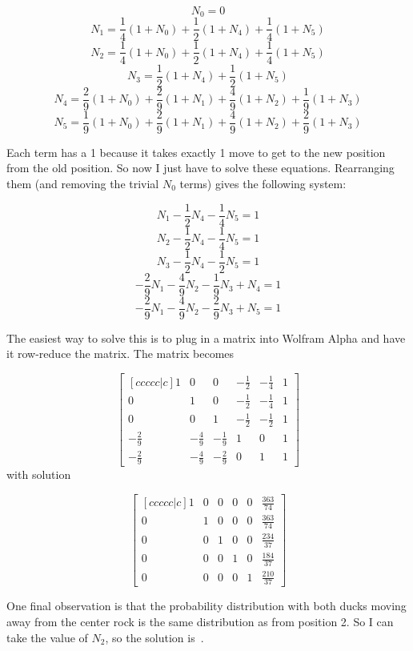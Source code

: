 \documentclass{article}
\begin{document}
\[
N_{0}=0
\]
\[
N_{1}=\frac{1}{4}(1+N_{0})+\frac{1}{2}(1+N_{4})+\frac{1}{4}(1+N_{5})
\]
\[
N_{2}=\frac{1}{4}(1+N_{0})+\frac{1}{2}(1+N_{4})+\frac{1}{4}(1+N_{5})
\]
\[
N_{3}=\frac{1}{2}(1+N_{4})+\frac{1}{2}(1+N_{5})
\]
\[
N_{4}=\frac{2}{9}(1+N_{0})+\frac{2}{9}(1+N_{1})+\frac{4}{9}(1+N_{2})+\frac{1}{9}(1+N_{3})
\]
\[
N_{5}=\frac{1}{9}(1+N_{0})+\frac{2}{9}(1+N_{1})+\frac{4}{9}(1+N_{2})+\frac{2}{9}(1+N_{3})
\]

Each term has a 1 because it takes exactly 1 move to get to the new position from the old position.
So now I just have to solve these equations.
Rearranging them (and removing the trivial $N_{0}$ terms) gives the following system:

\[
N_{1}-\frac{1}{2}N_{4}-\frac{1}{4}N_{5}=1
\]
\[
N_{2}-\frac{1}{2}N_{4}-\frac{1}{4}N_{5}=1
\]
\[
N_{3}-\frac{1}{2}N_{4}-\frac{1}{2}N_{5}=1
\]
\[
-\frac{2}{9}N_{1}-\frac{4}{9}N_{2}-\frac{1}{9}N_{3}+N_{4}=1
\]
\[
-\frac{2}{9}N_{1}-\frac{4}{9}N_{2}-\frac{2}{9}N_{3}+N_{5}=1
\]

The easiest way to solve this is to plug in a matrix into Wolfram Alpha and have it row-reduce the matrix.
The matrix becomes

\[
\begin{bmatrix}[ccccc|c]
1            & 0            & 0            & -\frac{1}{2} & -\frac{1}{4} & 1 \\
0            & 1            & 0            & -\frac{1}{2} & -\frac{1}{4} & 1 \\
0            & 0            & 1            & -\frac{1}{2} & -\frac{1}{2} & 1 \\
-\frac{2}{9} & -\frac{4}{9} & -\frac{1}{9} & 1            & 0            & 1 \\
-\frac{2}{9} & -\frac{4}{9} & -\frac{2}{9} & 0            & 1            & 1
\end{bmatrix}
\]
with solution

\[
\begin{bmatrix}[ccccc|c]
1 & 0 & 0 & 0 & 0 & \frac{363}{74} \\
0 & 1 & 0 & 0 & 0 & \frac{363}{74} \\
0 & 0 & 1 & 0 & 0 & \frac{234}{37} \\
0 & 0 & 0 & 1 & 0 & \frac{184}{37} \\
0 & 0 & 0 & 0 & 1 & \frac{210}{37}
\end{bmatrix}
\]

One final observation is that the probability distribution with both ducks moving away from the center rock is the same distribution as from position 2.
So I can take the value of $N_{2}$, so the solution is
\,.
\end{document}
